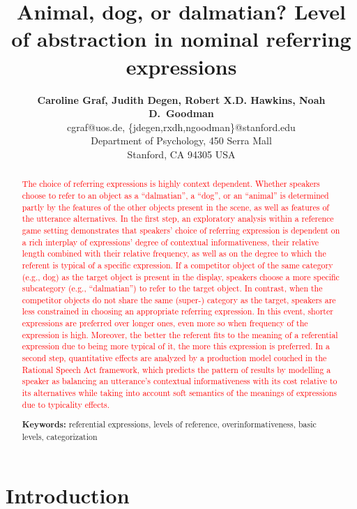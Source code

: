 \documentclass[10pt,letterpaper]{article}
\title{Animal, dog, or dalmatian? Level of abstraction in nominal referring expressions}
\author{{\large \bf Caroline Graf, Judith Degen, Robert X.D. Hawkins, Noah D.~Goodman} \\
  cgraf@uos.de, \{jdegen,rxdh,ngoodman\}@stanford.edu\\
  Department of Psychology, 450 Serra Mall \\
  Stanford, CA 94305 USA}
\newcommand{\red}[1]{\textcolor{Red}{#1}}
\begin{document}
\maketitle


\begin{abstract}

\red{The choice of referring expressions is highly context dependent. Whether speakers choose to refer to an object as a ``dalmatian'', a ``dog'', or an ``animal'' is determined partly by the features of the other objects present in the scene, as well as features of the utterance alternatives. In the first step, an exploratory analysis within a reference game setting demonstrates that speakers' choice of referring expression is dependent on a rich interplay of expressions' degree of contextual informativeness, their relative length combined with their relative frequency, as well as on the degree to which the referent is typical of a specific expression. If a competitor object of the same category (e.g., dog) as the target object is present in the display, speakers choose a more specific subcategory (e.g., ``dalmatian'') to refer to the target object. In contrast, when the competitor objects do not share the same (super-) category as the target, speakers are less constrained in choosing an appropriate referring expression. In this event, shorter expressions are preferred over longer ones, even more so when frequency of the expression is high. Moreover, the better the referent fits to the meaning of a referential expression due to being more typical of it, the more this expression is preferred. In a second step, quantitative effects are analyzed by a production model couched in the Rational Speech Act framework, which predicts the pattern of results by modelling a speaker as balancing an utterance's contextual informativeness with its cost relative to its alternatives while taking into account soft semantics of the meanings of expressions due to typicality effects.}

\textbf{Keywords:} 
referential expressions, levels of reference, overinformativeness, basic levels, categorization
\end{abstract}

\section{\bf Introduction}
\end{document}
